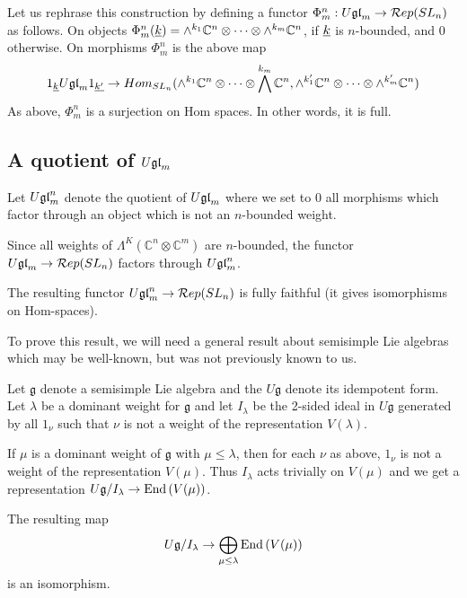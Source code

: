 \documentclass[11pt,leqno]{article}
\begin{document}
Let us rephrase this construction by defining a functor $ \Phi_m^n : U\mathfrak{gl}_{m} \rightarrow \mathcal{R}ep(SL_{n}) $ as follows.  On objects $ \Phi_m^n({\underline{k}}) = \wedge^{k_1} \mathbb C^n \otimes \cdots \otimes \wedge^{k_m} \mathbb C^n $, if $ {\underline{k}} $ is $n$-bounded, and 0 otherwise.  On morphisms $ \Phi_m^n $ is the above map 
$$
1_{\underline{k}} U\mathfrak{gl}_{m} 1_{\underline{k'}} \rightarrow Hom_{SL_n}(\wedge^{k_1} \mathbb C^n \otimes \cdots \otimes \bigwedge^{k_m} \mathbb C^n, \wedge^{k'_1} \mathbb C^n \otimes \cdots \otimes \wedge^{k'_m} \mathbb C^n)
$$
As above, $ \Phi_m^n $ is a surjection on Hom spaces.  In other words, it is full.

\subsection{A quotient of $U\mathfrak{gl}_{m}$}
Let $ U\mathfrak{gl}_{m}^n $ denote the quotient of $ U\mathfrak{gl}_{m} $ where we set to 0 all morphisms which factor through an object which is not an $n$-bounded weight.

Since all weights of $ \Lambda^K(\mathbb{C}^n \otimes \mathbb{C}^m) $ are $ n$-bounded, the functor $ U\mathfrak{gl}_{m} \rightarrow \mathcal{R}ep(SL_{n}) $ factors through $ U\mathfrak{gl}_{m}^n $.

\begin{thm} \label{th:functorfullyfaithful}
The resulting functor $ U\mathfrak{gl}_{m}^n \rightarrow \mathcal{R}ep(SL_{n})$ is fully faithful (it gives isomorphisms on Hom-spaces).
\end{thm}

To prove this result, we will need a general result about semisimple Lie algebras which may be well-known, but was not previously known to us.

Let $ \mathfrak g $ denote a semisimple Lie algebra and the $ U \mathfrak g $ denote its idempotent form.  Let $ \lambda $ be a dominant weight for $ \mathfrak g $ and let $ I_\lambda $ be the 2-sided ideal in $ U\mathfrak g $ generated by all $ 1_\nu $ such that $ \nu $ is not a weight of the representation $ V(\lambda) $.

If $ \mu $ is a dominant weight of $ \mathfrak g $ with $ \mu \le \lambda $, then for each $ \nu $ as above, $ 1_\nu $ is not a weight of the representation $ V(\mu)$.  Thus $ I_\lambda $ acts trivially on $ V(\mu) $ and we get a representation $ U \mathfrak g / I_\lambda \rightarrow \operatorname{End}\left(V(\mu)\right) $.

\begin{lem}
The resulting map
$$
U \mathfrak g / I_\lambda \rightarrow \bigoplus_{\mu \le \lambda} \operatorname{End}\left( V(\mu)\right)
$$
is an isomorphism.
\end{lem}
\end{document}
